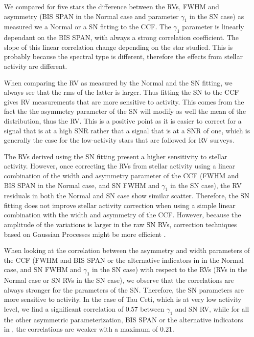 \documentclass[11pt, oneside]{article}
\def\kms{\hbox{\,km\,s$^{-1}$}}       %
\begin{document}
We compared for five stars the difference between the RVs, FWHM and asymmetry (BIS SPAN in the Normal case and parameter $\gamma_1$ in the SN case) as measured we a Normal or a SN fitting to the CCF. The $\gamma_1$ parameter is linearly dependant on the BIS SPAN, with always a strong correlation coefficient. 
The slope of this linear correlation change depending on the star studied. This is probably because the spectral type is different, therefore the effects from stellar activity are different.

When comparing the RV as measured by the Normal and the SN fitting, we always see that the rms of the latter is larger. Thus fitting the SN to the CCF gives RV measurements that are more sensitive to activity. This comes from the fact the the asymmetry parameter of the SN will modify as well the mean of the distribution, thus the RV. This is a positive point as it is easier to correct for a signal that is at a high SNR rather that a signal that is at a SNR of one, which is generally the case for the low-activity stars that are followed for RV surveys.

The RVs derived using the SN fitting present a higher sensitivity to stellar activity. However, once correcting the RVs from stellar activity using a linear combination of the width and asymmetry parameter of the CCF (FWHM and BIS SPAN in the Normal case, and SN FWHM and $\gamma_1$ in the SN case), the RV residuals in both the Normal and SN case show similar scatter. Therefore, the SN fitting does not improve stellar activity correction when using a simple linear combination with the width and asymmetry of the CCF. However, because the amplitude of the variations is larger in the raw SN RVs, correction techniques based on Gaussian Processes might be more efficient \citep[][]{Haywood-2014,Faria-2016a}. 

When looking at the correlation between the asymmetry and width parameters of the CCF (FWHM and BIS SPAN or the alternative indicators in \citet{Figueira-2013} in the Normal case, and SN FWHM and $\gamma_1$ in the SN case) with respect to the RVs (RVs in the Normal case or SN RVs in the SN case), we observe that the correlations are always stronger for the parameters of the SN. Therefore, the SN parameters are more sensitive to activity. In the case of Tau Ceti, which is at very low activity level, we find a significant correlation of 0.57 between $\gamma_1$ and SN RV, while for all the other asymmetric parameterization, BIS SPAN or the alternative indicators in \citet{Figueira-2013}, the correlations are weaker with a maximum of 0.21.
\end{document}
